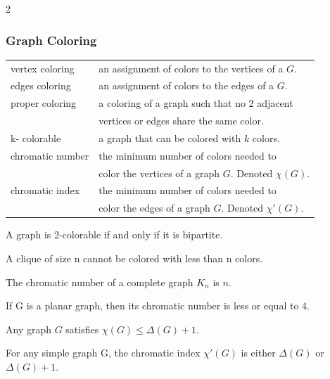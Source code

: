 \documentclass[5pt]{article}
\begin{document}
\begin{multicols}{2}
\subsubsection{Graph Coloring}
\begin{tabular}{ll}
    vertex coloring     & an assignment of colors to the vertices of a $G$. \\
    edges coloring      & an assignment of colors to the edges of a $G$. \\
    proper coloring     & a coloring of a graph such that no 2 adjacent\\
                        & vertices or edges share the same color. \\
    k- colorable        & a graph that can be colored with $k$ colors. \\
    chromatic number    & the minimum number of colors needed to\\
                        & color the vertices of a graph $G$. \small{Denoted $\chi(G)$}. \\
    chromatic index     & the minimum number of colors needed to\\
                        & color the edges of a graph $G$. Denoted $\chi'(G)$. \\
\end{tabular}

\begin{properties}
    \begin{itemize*}
        \item A graph is 2-colorable if and only if it is bipartite.
        \item A clique of size n cannot be colored with less than n colors.
        \item The chromatic number of a complete graph $K_n$ is $n$.
    \end{itemize*}
\end{properties}

\begin{theorem}
    If G is a planar graph, then its chromatic number is
    less or equal to 4.
\end{theorem}

\begin{theorem}
    Any graph $G$ satisfies $\chi(G)\leq \Delta(G)+1$.
\end{theorem}

\begin{theorem}
    For any simple graph G, the chromatic index $\chi'(G)$ is either $\Delta(G)$ or $\Delta(G)+1$.
\end{theorem}


\end{multicols}
\end{document}
